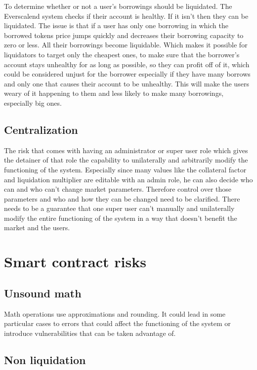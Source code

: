 To determine whether or not a user's borrowings should be liquidated. The Everscalend system checks if their account is healthy. If it isn't then they can be liquidated. The issue is that if a user has only one borrowing in which the borrowed tokens price jumps quickly and decreases their borrowing capacity to zero or less. All their borrowings become liquidable. Which makes it possible for liquidators to target only the cheapest ones, to make sure that the borrower's account stays unhealthy for as long as possible, so they can profit off of it, which could be considered unjust for the borrower especially if they have many borrows and only one that causes their account to be unhealthy. This will make the users weary of it happening to them and less likely to make many borrowings, especially big ones.

\subsection{Centralization}

The risk that comes with having an administrator or super user role which gives the detainer of that role the capability to unilaterally and arbitrarily modify the functioning of the system. Especially since many values like the collateral factor and liquidation multiplier are editable with an admin role, he can also decide who can and who can't change market parameters. Therefore control over those parameters and who and how they can be changed need to be clarified. There needs to be a guarantee that one super user can't manually and unilaterally modify the entire functioning of the system in a way that doesn't benefit the market and the users.


\section{Smart contract risks}

\subsection{Unsound math}

Math operations use approximations and rounding. It could lead in some particular cases to errors that could affect the functioning of the system or introduce vulnerabilities that can be taken advantage of.

\subsection{Non liquidation}

